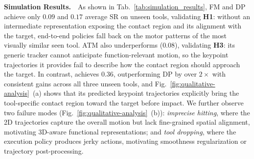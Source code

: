 \textbf{Simulation Results.}~~As shown in Tab.~\ref{tab:simulation_results}, FM and DP achieve only $0.09$ and $0.17$ average SR on unseen tools, validating \textbf{H1}: without an intermediate representation exposing the contact region and its alignment with the target, end-to-end policies fall back on the motor patterns of the most visually similar seen tool. 
ATM also underperforms ($0.08$), validating \textbf{H3}: its generic tracker cannot anticipate function-relevant motion, so the keypoint trajectories it provides fail to describe how the contact region should approach the target. 
In contrast, \algoname{} achieves $0.36$, outperforming DP by over $2\times$ with consistent gains across all three unseen tools, and Fig.~\ref{fig:qualitative-analysis}~(a) shows that its predicted keypoint trajectories explicitly bring the tool-specific contact region toward the target before impact. 
We further observe two failure modes (Fig.~\ref{fig:qualitative-analysis}~(b)): \textit{imprecise hitting}, where the 2D trajectories capture the overall motion but lack fine-grained spatial alignment, motivating 3D-aware functional representations; and \textit{tool dropping}, where the execution policy produces jerky actions, motivating smoothness regularization or trajectory post-processing.


